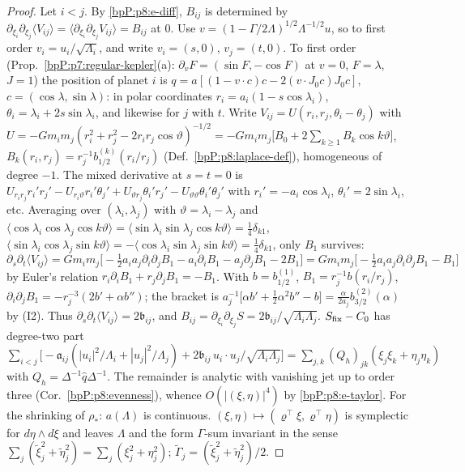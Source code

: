 \begin{proof}
\label{stepP:p8:qf-cross} Let $i<j$. By \ref{bpP:p8:e-diff}, $B_{ij}$ is determined by $\partial_{\xi_i}\partial_{\xi_j}\langle V_{ij}\rangle=\langle\partial_{\xi_i}\partial_{\xi_j}V_{ij}\rangle=B_{ij}$ at $0$. Use $v=(1-\Gamma/2\Lambda)^{1/2}\Lambda^{-1/2}u$, so to first order $v_i=u_i/\sqrt{\Lambda_i}$, and write $v_i=(s,0)$, $v_j=(t,0)$. To first order (Prop.~\ref{bpP:p7:regular-kepler}(a): $\partial_vF=(\sin F,-\cos F)$ at $v=0$, $F=\lambda$, $J=1$) the position of planet $i$ is $q=a[(1-v\cdot c)c-2(v\cdot J_0c)J_0c]$, $c=(\cos\lambda,\sin\lambda)$: in polar coordinates $r_i=a_i(1-s\cos\lambda_i)$, $\theta_i=\lambda_i+2s\sin\lambda_i$, and likewise for $j$ with $t$. Write $V_{ij}=U(r_i,r_j,\theta_i-\theta_j)$ with $U=-Gm_im_j(r_i^2+r_j^2-2r_ir_j\cos\vartheta)^{-1/2}=-Gm_im_j\big[B_0+2\sum_{k\ge1}B_k\cos k\vartheta\big]$, $B_k(r_i,r_j)=r_j^{-1}b_{1/2}^{(k)}(r_i/r_j)$ (Def.~\ref{bpP:p8:laplace-def}), homogeneous of degree $-1$. The mixed derivative at $s=t=0$ is $U_{r_ir_j}r_i'r_j'-U_{r_i\vartheta}r_i'\theta_j'+U_{\vartheta r_j}\theta_i'r_j'-U_{\vartheta\vartheta}\theta_i'\theta_j'$ with $r_i'=-a_i\cos\lambda_i$, $\theta_i'=2\sin\lambda_i$, etc. Averaging over $(\lambda_i,\lambda_j)$ with $\vartheta=\lambda_i-\lambda_j$ and $\langle\cos\lambda_i\cos\lambda_j\cos k\vartheta\rangle=\langle\sin\lambda_i\sin\lambda_j\cos k\vartheta\rangle=\tfrac14\delta_{k1}$, $\langle\sin\lambda_i\cos\lambda_j\sin k\vartheta\rangle=-\langle\cos\lambda_i\sin\lambda_j\sin k\vartheta\rangle=\tfrac14\delta_{k1}$, only $B_1$ survives:
\[\partial_s\partial_t\langle V_{ij}\rangle=Gm_im_j\Big[-\tfrac12a_ia_j\partial_i\partial_jB_1-a_i\partial_iB_1-a_j\partial_jB_1-2B_1\Big]=Gm_im_j\Big[-\tfrac12a_ia_j\partial_i\partial_jB_1-B_1\Big]\]
by Euler's relation $r_i\partial_iB_1+r_j\partial_jB_1=-B_1$. With $b=b_{1/2}^{(1)}$, $B_1=r_j^{-1}b(r_i/r_j)$, $\partial_i\partial_jB_1=-r_j^{-3}(2b'+\alpha b'')$; the bracket is $a_j^{-1}\big[\alpha b'+\tfrac12\alpha^2b''-b\big]=\frac{\alpha}{2a_j}b_{3/2}^{(2)}(\alpha)$ by (I2). Thus $\partial_s\partial_t\langle V_{ij}\rangle=2\mathfrak b_{ij}$, and $B_{ij}=\partial_{\xi_i}\partial_{\xi_j}S=2\mathfrak b_{ij}/\sqrt{\Lambda_i\Lambda_j}$.
\label{stepP:p8:qf-assembly} $S_{\rm fix}-C_0$ has degree-two part $\sum_{i<j}\big[-\mathfrak a_{ij}(|u_i|^2/\Lambda_i+|u_j|^2/\Lambda_j)+2\mathfrak b_{ij}\,u_i\cdot u_j/\sqrt{\Lambda_i\Lambda_j}\big]=\sum_{j,k}(Q_h)_{jk}(\xi_j\xi_k+\eta_j\eta_k)$ with $Q_h=\Delta^{-1}\hat q\Delta^{-1}$. The remainder is analytic with vanishing jet up to order three (Cor.~\ref{bpP:p8:evenness}), whence $O(|(\xi,\eta)|^4)$ by \ref{bpP:p8:e-taylor}. For the shrinking of $\rho_*$: $a(\Lambda)$ is continuous.
\label{stepP:p8:qf-diag2} $(\xi,\eta)\mapsto(\varrho^\top\xi,\varrho^\top\eta)$ is symplectic for $d\eta\wedge d\xi$ and leaves $\Lambda$ and the form $\Gamma$-sum invariant in the sense $\sum_j(\tilde\xi_j^2+\tilde\eta_j^2)=\sum_j(\xi_j^2+\eta_j^2)$; $\tilde\Gamma_j=(\tilde\xi_j^2+\tilde\eta_j^2)/2$.
\end{proof}


